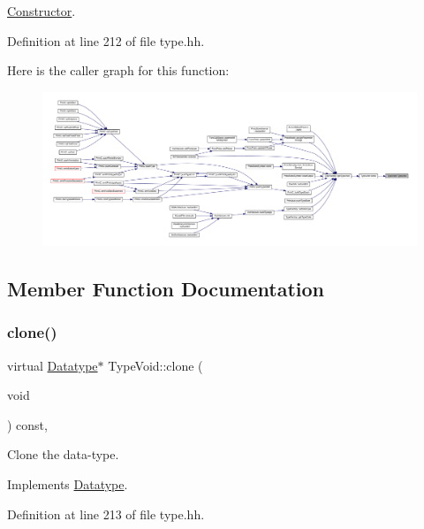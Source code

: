 \mbox{\hyperlink{class_constructor}{Constructor}}. 



Definition at line 212 of file type.\+hh.

Here is the caller graph for this function\+:
\nopagebreak
\begin{figure}[H]
\begin{center}
\leavevmode
\includegraphics[width=350pt]{class_type_void_af09fbc39a21e0a7b9fcedfed715c9592_icgraph}
\end{center}
\end{figure}


\subsection{Member Function Documentation}
\mbox{\label{class_type_void_a4fe8a82cb4657566119e63b73164d22a}} 
\subsubsection{\texorpdfstring{clone()}{clone()}}
{\footnotesize\ttfamily virtual \mbox{\hyperlink{class_datatype}{Datatype}}$\ast$ Type\+Void\+::clone (\begin{DoxyParamCaption}\item[{void}]{ }\end{DoxyParamCaption}) const\hspace{0.3cm}{\ttfamily [inline]}, {\ttfamily [virtual]}}



Clone the data-\/type. 



Implements \mbox{\hyperlink{class_datatype_a6bd032d91f40efe36841adc85b3ff0ec}{Datatype}}.



Definition at line 213 of file type.\+hh.

